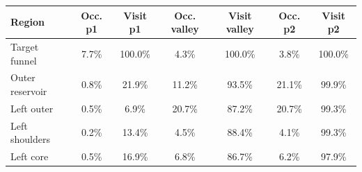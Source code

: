 \begin{tabular}{lcccccc}
\toprule
Region & Occ. p1 & Visit p1 & Occ. valley & Visit valley & Occ. p2 & Visit p2 \\
\midrule
Target funnel & 7.7\% & 100.0\% & 4.3\% & 100.0\% & 3.8\% & 100.0\% \\
Outer reservoir & 0.8\% & 21.9\% & 11.2\% & 93.5\% & 21.1\% & 99.9\% \\
Left outer & 0.5\% & 6.9\% & 20.7\% & 87.2\% & 20.7\% & 99.3\% \\
Left shoulders & 0.2\% & 13.4\% & 4.5\% & 88.4\% & 4.1\% & 99.3\% \\
Left core & 0.5\% & 16.9\% & 6.8\% & 86.7\% & 6.2\% & 97.9\% \\
\bottomrule
\end{tabular}
